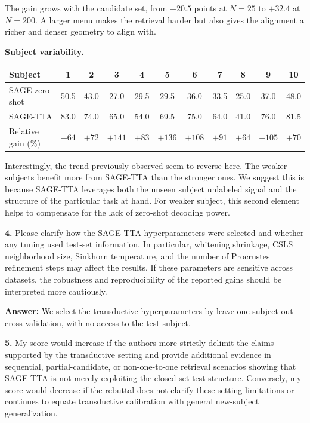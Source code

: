 \documentclass[11pt]{article}
\newcommand{\answer}[1]{{\textbf{Answer:} \color{blue} #1}}
\begin{document}
{The gain grows with the candidate set, from $+20.5$ points at $N=25$ to $+32.4$ at $N=200$. A larger menu
makes the retrieval harder but also gives the alignment a richer and denser geometry to align with.

\textbf{Subject variability.}

\begin{center}
\small
\begin{tabular}{lcccccccccc}
\hline
Subject & 1 & 2 & 3 & 4 & 5 & 6 & 7 & 8 & 9 & 10 \\
\hline
SAGE-zero-shot & 50.5 & 43.0 & 27.0 & 29.5 & 29.5 & 36.0 & 33.5 & 25.0 & 37.0 & 48.0 \\
SAGE-TTA & 83.0 & 74.0 & 65.0 & 54.0 & 69.5 & 75.0 & 64.0 & 41.0 & 76.0 & 81.5 \\
Relative gain (\%) & $+64$ & $+72$ & $+141$ & $+83$ & $+136$ & $+108$ & $+91$ & $+64$ & $+105$ & $+70$ \\
\hline
\end{tabular}
\end{center}

Interestingly, the trend previously observed seem to reverse here. The weaker subjects benefit more from SAGE-TTA than the stronger ones. We suggest this is because SAGE-TTA leverages both the unseen subject unlabeled signal and the structure of the particular task at hand. For weaker subject, this second element helps to compensate for the lack of zero-shot decoding power.

}

\textbf{4.} Please clarify how the SAGE-TTA hyperparameters were selected and whether any tuning used
test-set information. In particular, whitening shrinkage, CSLS neighborhood size, Sinkhorn
temperature, and the number of Procrustes refinement steps may affect the results. If these parameters
are sensitive across datasets, the robustness and reproducibility of the reported gains should be
interpreted more cautiously.

\answer{
We select the transductive hyperparameters by leave-one-subject-out cross-validation, with no access to
the test subject. 
}

\textbf{5.} My score would increase if the authors more strictly delimit the claims supported by the
transductive setting and provide additional evidence in sequential, partial-candidate, or
non-one-to-one retrieval scenarios showing that SAGE-TTA is not merely exploiting the closed-set test
structure. Conversely, my score would decrease if the rebuttal does not clarify these setting
limitations or continues to equate transductive calibration with general new-subject generalization.
\end{document}
